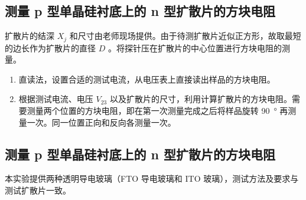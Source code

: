 \documentclass[a4paper,utf8]{article}
\begin{document}
    \subsection{测量 p 型单晶硅衬底上的 n 型扩散片的方块电阻 }
        扩散片的结深 $X_j$ 和尺寸由老师现场提供。由于待测扩散片近似正方形，故取最短的边长作为扩散片的直径 $D$ 。将探针压在扩散片的中心位置进行方块电阻的测量。
        \begin{enumerate}
            \item 直读法，设置合适的测试电流，从电压表上直接读出样品的方块电阻。
            \item 根据测试电流、电压 $V_{23}$ 以及扩散片的尺寸，利用计算扩散片的方块电阻。需要测量两个位置的方块电阻，即在第一次测量完成之后将样品旋转 \SI{90}{\degree} 再测量一次。同一位置正向和反向各测量一次。
        \end{enumerate}
    \subsection{测量 p 型单晶硅衬底上的 n 型扩散片的方块电阻 }
        本实验提供两种透明导电玻璃（FTO 导电玻璃和 ITO 玻璃），测试方法及要求与测试扩散片一致。
\end{document}
